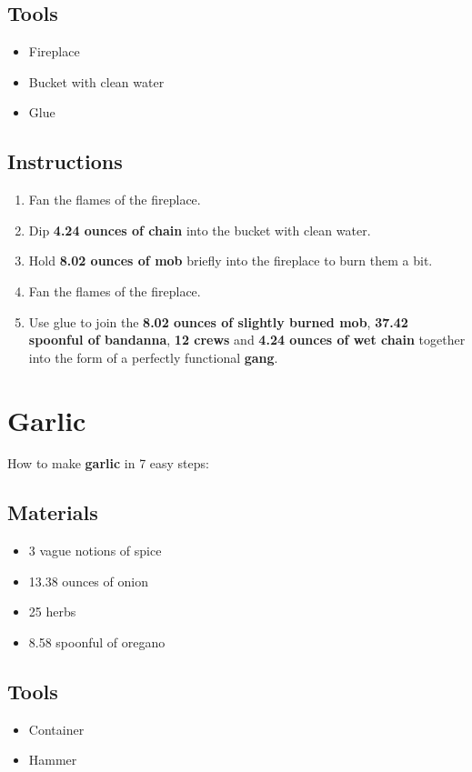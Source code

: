 \documentclass{article}
\begin{document}
\subsection{Tools}\begin{itemize}
\item 
Fireplace
\item 
Bucket with clean water
\item 
Glue
\end{itemize}
\subsection{Instructions}\begin{enumerate}
\item 
Fan the flames of the fireplace.
\item 
Dip \textbf{4.24 ounces of chain} into the bucket with clean water.
\item 
Hold \textbf{8.02 ounces of mob} briefly into the fireplace to burn them a bit.
\item 
Fan the flames of the fireplace.
\item 
Use glue to join the \textbf{8.02 ounces of slightly burned mob}, \textbf{37.42 spoonful of bandanna}, \textbf{12 crews} and \textbf{4.24 ounces of wet chain} together into the form of a perfectly functional \textbf{gang}.
\end{enumerate}
\newpage
\section{Garlic}How to make \textbf{garlic} in 7 easy steps:

\subsection{Materials}\begin{itemize}
\item 
3 vague notions of spice
\item 
13.38 ounces of onion
\item 
25 herbs
\item 
8.58 spoonful of oregano
\end{itemize}
\subsection{Tools}\begin{itemize}
\item 
Container
\item 
Hammer
\end{itemize}
\end{document}
